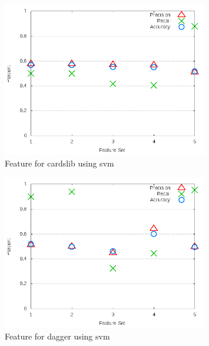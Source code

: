 \begin{figure}[!t]
\centering
\includegraphics[width=0.8\textwidth]{images/svm/test_3/cardslib_sample_range.png}
\caption{Feature for cardslib using \gls{svm}}
\label{fig:test_3_cardslib_svm}
\end{figure}

\begin{figure}[!t]
\centering
\includegraphics[width=0.8\textwidth]{images/svm/test_3/dagger_sample_range.png}
\caption{Feature for dagger using \gls{svm}}
\label{fig:test_3_dagger_svm}
\end{figure}

